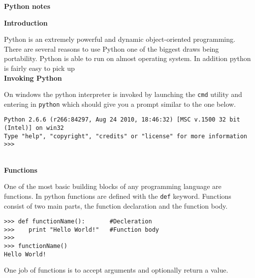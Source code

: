 \documentclass[letterpaper,11pt]{article}
\begin{document}
\begin{flushleft}
    \LARGE{\textbf{Python notes}}
\end{flushleft}
\textbf{Introduction}
\par{Python is an extremely powerful and dynamic object-oriented programming.
There are several reasons to use Python one of the biggest draws being
portability. Python is able to run on almost operating system. In addition
python is fairly easy to pick up}
\\
\textbf{Invoking Python}
\par{On windows the python interpreter is invoked by launching the
\texttt{cmd} utility and entering in \texttt{python} which should give you a
prompt similar to the one below.}
\\
\begin{minipage}{1\textwidth}
    \begin{tcolorbox}
        \begin{footnotesize}
\begin{verbatim}
Python 2.6.6 (r266:84297, Aug 24 2010, 18:46:32) [MSC v.1500 32 bit (Intel)] on win32
Type "help", "copyright", "credits" or "license" for more information
>>>
            \end{verbatim}
        \end{footnotesize}
    \end{tcolorbox}
\end{minipage}
\\
\textbf{Functions}
\par{One of the most basic building blocks of any programming language are
functions. In python functions are defined with the \texttt{def} keyword.
Functions consist of two main parts, the function declaration and the function
body.}
\\
\begin{minipage}{.5\textwidth}
    \begin{tcolorbox}
        \begin{footnotesize}
            \begin{verbatim}
>>> def functionName():       #Decleration
>>>    print "Hello World!"   #Function body
>>>
>>> functionName()
Hello World!
            \end{verbatim}
        \end{footnotesize}
    \end{tcolorbox}
\end{minipage}
\par{One job of functions is to accept arguments and optionally return a value.}
\end{document}
